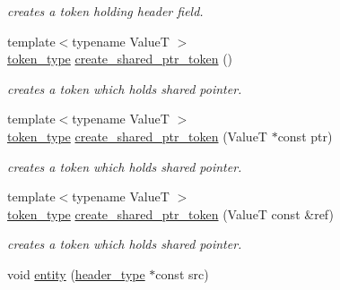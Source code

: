 \begin{DoxyCompactItemize}
\begin{DoxyCompactList}\small\item\em creates a token holding header field. \end{DoxyCompactList}\item 
\hypertarget{classhryky_1_1http_1_1header_1_1_parser_a0593e9a0e2cd945d715cfbaf0a3f2fdb}{{\footnotesize template$<$typename Value\-T $>$ }\\\hyperlink{classhryky_1_1_vector}{token\-\_\-type} \hyperlink{classhryky_1_1http_1_1header_1_1_parser_a0593e9a0e2cd945d715cfbaf0a3f2fdb}{create\-\_\-shared\-\_\-ptr\-\_\-token} ()}\label{classhryky_1_1http_1_1header_1_1_parser_a0593e9a0e2cd945d715cfbaf0a3f2fdb}

\begin{DoxyCompactList}\small\item\em creates a token which holds shared pointer. \end{DoxyCompactList}\item 
\hypertarget{classhryky_1_1http_1_1header_1_1_parser_ab787930a2806672fdec7f55975e9e57f}{{\footnotesize template$<$typename Value\-T $>$ }\\\hyperlink{classhryky_1_1_vector}{token\-\_\-type} \hyperlink{classhryky_1_1http_1_1header_1_1_parser_ab787930a2806672fdec7f55975e9e57f}{create\-\_\-shared\-\_\-ptr\-\_\-token} (Value\-T $\ast$const ptr)}\label{classhryky_1_1http_1_1header_1_1_parser_ab787930a2806672fdec7f55975e9e57f}

\begin{DoxyCompactList}\small\item\em creates a token which holds shared pointer. \end{DoxyCompactList}\item 
\hypertarget{classhryky_1_1http_1_1header_1_1_parser_a0d76245a0fba088b5d7f7baa7039f86b}{{\footnotesize template$<$typename Value\-T $>$ }\\\hyperlink{classhryky_1_1_vector}{token\-\_\-type} \hyperlink{classhryky_1_1http_1_1header_1_1_parser_a0d76245a0fba088b5d7f7baa7039f86b}{create\-\_\-shared\-\_\-ptr\-\_\-token} (Value\-T const \&ref)}\label{classhryky_1_1http_1_1header_1_1_parser_a0d76245a0fba088b5d7f7baa7039f86b}

\begin{DoxyCompactList}\small\item\em creates a token which holds shared pointer. \end{DoxyCompactList}\item 
\hypertarget{classhryky_1_1http_1_1header_1_1_parser_aa3ec488303300e2af7ab5b1163eed501}{void \hyperlink{classhryky_1_1http_1_1header_1_1_parser_aa3ec488303300e2af7ab5b1163eed501}{entity} (\hyperlink{classhryky_1_1http_1_1header_1_1_entity}{header\-\_\-type} $\ast$const src)}\label{classhryky_1_1http_1_1header_1_1_parser_aa3ec488303300e2af7ab5b1163eed501}


\end{DoxyCompactItemize}
